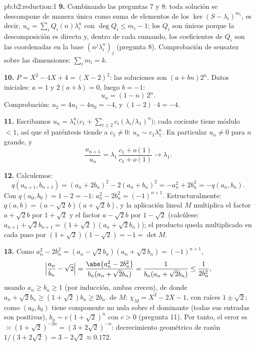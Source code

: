 \begin{solution}{pb:b2:reduction:1}
\textbf{9.} Combinando las preguntas 7 y 8: toda solución se
descompone de manera única como suma de elementos de los $\ker(S -
\lambda_i)^{m_i}$, es decir, $u_n = \sum_i Q_i(n)\lambda_i^n$ con
$\deg Q_i \leq m_i - 1$; los $Q_i$ son únicos porque la
descomposición es directa y, dentro de cada sumando, los
coeficientes de $Q_i$ son las coordenadas en la base
$(n^j\lambda_i^n)_j$ (pregunta 8). Comprobación de sensatez sobre
las dimensiones: $\sum_i m_i = k$.

\textbf{10.} $P = X^2 - 4X + 4 = (X - 2)^2$: las soluciones son
$(a + bn)2^n$. Datos iniciales: $a = 1$ y $2(a + b) = 0$, luego $b
= -1$:
\[
u_n = (1 - n)\,2^n .
\]
Comprobación: $u_2 = 4u_1 - 4u_0 = -4$, y $(1 - 2)\cdot4 = -4$.

\textbf{11.} Escribamos $u_n = \lambda_1^n\bigl(c_1 +
\sum_{i\geq2} c_i(\lambda_i/\lambda_1)^n\bigr)$; cada cociente
tiene módulo $< 1$, así que el paréntesis tiende a $c_1 \neq 0$:
$u_n \sim c_1\lambda_1^n$. En particular $u_n \neq 0$ para $n$
grande, y
\[
\frac{u_{n+1}}{u_n} =
\lambda_1\,\frac{c_1 + o(1)}{c_1 + o(1)} \longrightarrow
\lambda_1 .
\]

\textbf{12.} Calculemos:
\[
q(a_{n+1}, b_{n+1}) = (a_n + 2b_n)^2 - 2(a_n + b_n)^2
= -a_n^2 + 2b_n^2 = -q(a_n, b_n).
\]
Con $q(a_0, b_0) = 1 - 2 = -1$: $a_n^2 - 2b_n^2 = (-1)^{n+1}$.
Estructuralmente: $q(a, b) = (a - \sqrt2\,b)(a + \sqrt2\,b)$, y la
aplicación lineal $M$ multiplica el factor $a + \sqrt2 b$ por $1 +
\sqrt2$ y el factor $a - \sqrt2 b$ por $1 - \sqrt2$ (calcúlese:
$a_{n+1} + \sqrt2 b_{n+1} = (1 + \sqrt2)(a_n + \sqrt2 b_n)$); el
producto queda multiplicado en cada paso por $(1 + \sqrt2)(1 -
\sqrt2) = -1 = \det M$.

\textbf{13.} Como $a_n^2 - 2b_n^2 = (a_n - \sqrt2 b_n)(a_n +
\sqrt2 b_n) = (-1)^{n+1}$,
\[
\Bigl|\frac{a_n}{b_n} - \sqrt2\Bigr|
= \frac{\abs{a_n^2 - 2b_n^2}}{b_n(a_n + \sqrt2 b_n)}
= \frac{1}{b_n(a_n + \sqrt2 b_n)} \leq \frac1{2b_n^2},
\]
usando $a_n \geq b_n \geq 1$ (por inducción, ambas crecen), de
donde $a_n + \sqrt2 b_n \geq (1 + \sqrt2)b_n \geq 2b_n$.
 de $M$: $\chi_M = X^2 - 2X - 1$, con raíces $1 \pm
\sqrt2$; como $(a_0, b_0)$ tiene componente no nula sobre el
 dominante (todas sus entradas son positivas), $b_n
\sim c(1 + \sqrt2)^n$ con $c > 0$ (pregunta 11). Por tanto, el
error es $\asymp (1 + \sqrt2)^{-2n} = (3 + 2\sqrt2)^{-n}$:
decrecimiento geométrico de razón $1/(3 + 2\sqrt2) = 3 - 2\sqrt2
\approx 0.172$.


\end{solution}
